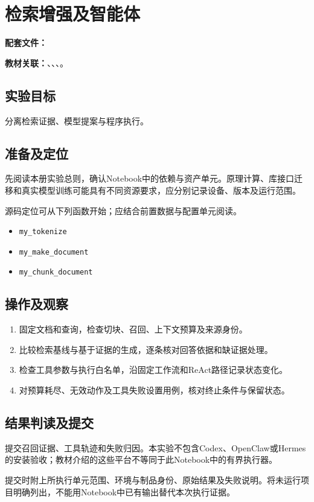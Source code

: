\chapter{检索增强及智能体}
\label{lab:90_llm_applications}

\noindent\textbf{配套文件：}\par
\noindent\textbf{教材关联：}、、、。

\section*{实验目标}
分离检索证据、模型提案与程序执行。

\section*{准备及定位}
先阅读本册实验总则，确认Notebook中的依赖与资产单元。原理计算、库接口迁移和真实模型训练可能具有不同资源要求，应分别记录设备、版本及运行范围。

源码定位可从下列函数开始；应结合前置数据与配置单元阅读。
\begin{itemize}
\item \texttt{my\_tokenize}
\item \texttt{my\_make\_document}
\item \texttt{my\_chunk\_document}
\end{itemize}

\section*{操作及观察}
\begin{enumerate}
\item 固定文档和查询，检查切块、召回、上下文预算及来源身份。
\item 比较检索基线与基于证据的生成，逐条核对回答依据和缺证据处理。
\item 检查工具参数与执行白名单，沿固定工作流和ReAct路径记录状态变化。
\item 对预算耗尽、无效动作及工具失败设置用例，核对终止条件与保留状态。
\end{enumerate}

\section*{结果判读及提交}
提交召回证据、工具轨迹和失败归因。本实验不包含Codex、OpenClaw或Hermes的安装验收；教材介绍的这些平台不等同于此Notebook中的有界执行器。

提交时附上所执行单元范围、环境与制品身份、原始结果及失败说明。将未运行项目明确列出，不能用Notebook中已有输出替代本次执行证据。
